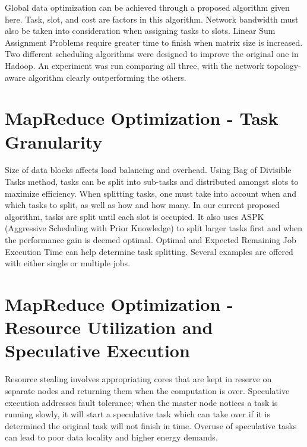 Global data optimization can be achieved through a proposed algorithm
given here. Task, slot, and cost are factors in this algorithm. Network
bandwidth must also be taken into consideration when assigning tasks to
slots. Linear Sum Assignment Problems require greater time to finish
when matrix size is increased. Two different scheduling algorithms were
designed to improve the original one in Hadoop. An experiment was run
comparing all three, with the network topology-aware algorithm clearly
outperforming the others.


\section{MapReduce Optimization - Task Granularity}

Size of data blocks affects load balancing and overhead. Using Bag of
Divisible Tasks method, tasks can be split into sub-tasks and
distributed amongst slots to maximize efficiency. When splitting tasks,
one must take into account when and which tasks to split, as well as how
and how many. In our current proposed algorithm, tasks are split until
each slot is occupied. It also uses ASPK (Aggressive Scheduling with
Prior Knowledge) to split larger tasks first and when the performance
gain is deemed optimal. Optimal and Expected Remaining Job Execution
Time can help determine task splitting. Several examples are offered
with either single or multiple jobs.


\section{MapReduce Optimization - Resource Utilization and Speculative Execution}

Resource stealing involves appropriating cores that are kept in reserve
on separate nodes and returning them when the computation is over.
Speculative execution addresses fault tolerance; when the master node
notices a task is running slowly, it will start a speculative task which
can take over if it is determined the original task will not finish in
time. Overuse of speculative tasks can lead to poor data locality and
higher energy demands.

